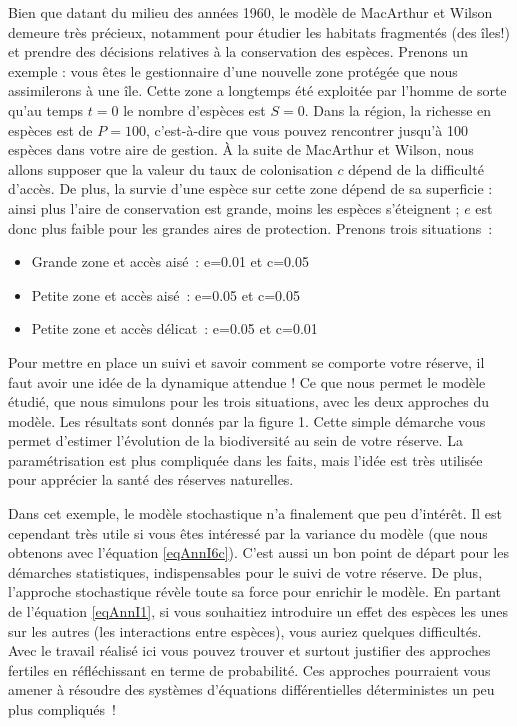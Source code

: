 Bien que datant du milieu des années 1960, le modèle de MacArthur et Wilson demeure très précieux, notamment pour étudier les habitats fragmentés (des îles!) et prendre des décisions relatives à la conservation des espèces. Prenons un exemple : vous êtes le gestionnaire d'une nouvelle zone protégée que nous assimilerons à une île. Cette zone a longtemps été exploitée par l'homme de sorte qu'au temps $t=0$ le nombre d'espèces est $S=0$. Dans la région, la richesse en espèces est de $P=100$, c'est-à-dire que vous pouvez rencontrer jusqu'à 100 espèces dans votre aire de gestion. À la suite de MacArthur et Wilson, nous allons supposer que la valeur du taux de colonisation $c$ dépend de la difficulté d'accès. De plus, la survie d'une espèce sur cette zone dépend de sa superficie : ainsi plus l'aire de conservation est grande, moins les espèces s'éteignent ; $e$ est donc plus faible pour les grandes aires de protection. Prenons trois situations~:
\begin{itemize}
\item Grande zone et accès aisé~: e=0.01 et c=0.05
\item Petite zone et accès aisé~: e=0.05 et c=0.05
\item Petite zone et accès délicat~: e=0.05 et c=0.01
\end{itemize}
Pour mettre en place un suivi et savoir comment se comporte votre réserve, il faut avoir une idée de la dynamique attendue ! Ce que nous permet le modèle étudié, que nous simulons pour les trois situations, avec les deux approches du modèle. Les résultats sont donnés par la figure 1. Cette simple démarche vous permet d'estimer l'évolution de la biodiversité au sein de votre réserve. La paramétrisation est plus compliquée dans les faits, mais l'idée est très utilisée pour apprécier la santé des réserves naturelles.


Dans cet exemple, le modèle stochastique n'a finalement que peu d'intérêt. Il est cependant très utile si vous êtes intéressé par la variance du modèle (que nous obtenons avec l'équation \eqref{eqAnnI6c}). C'est aussi un bon point de départ pour les démarches statistiques, indispensables pour le suivi de votre réserve. De plus, l'approche stochastique révèle toute sa force pour enrichir le modèle. En partant de l'équation \eqref{eqAnnI1}, si vous souhaitiez introduire un effet des espèces les unes sur les autres (les interactions entre espèces), vous auriez quelques difficultés. Avec le travail réalisé ici vous pouvez trouver et surtout justifier des approches fertiles en réfléchissant en terme de probabilité. Ces approches pourraient vous amener à résoudre des systèmes d'équations différentielles déterministes un peu plus compliqués~!


